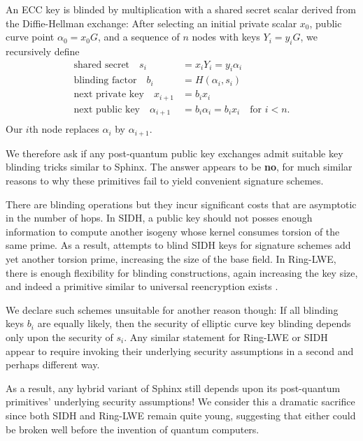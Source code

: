 \documentclass[twoside,letterpaper]{sig-alternate}
\def\mathcomma{,}
\def\mathcomma{}
\begin{document}
An ECC key is blinded by multiplication with a shared secret scalar
derived from the Diffie-Hellman exchange:
After selecting an initial private scalar $x_0$,
 public curve point $\alpha_0 = x_0 G$, and 
 a sequence of $n$ nodes with keys $Y_i = y_i G$,
we recursively define 
\[ \begin{aligned}
\textrm{shared secret}\quad
 s_i &= x_i Y_i = y_i \alpha_i \mathcomma \\
\textrm{blinding factor}\quad
 b_i &= H(\alpha_i,s_i) \mathcomma \\
\textrm{next private key}\quad
 x_{i+1} &= b_i x_i \mathcomma \\ %
\textrm{next public key}\quad
 \alpha_{i+1} &= b_i \alpha_i = b_i x_i \quad\textrm{for $i < n$.} \\
\end{aligned} \]
Our $i$th node replaces $\alpha_i$ by $\alpha_{i+1}$.

\smallskip

We therefore ask if any post-quantum public key exchanges admit 
suitable key blinding tricks similar to Sphinx. 
The answer appears to be {\bf no}, for much similar reasons to 
why these primitives fail to yield convenient signature schemes. 

There are blinding operations but they incur significant costs 
that are asymptotic in the number of hops.
%
In SIDH, a public key should not posses enough information to compute
another isogeny whose kernel consumes torsion of the same prime. 
As a result, attempts to blind SIDH keys for signature schemes add
yet another torsion prime, increasing the size of the base field.
%
In Ring-LWE, there is enough flexibility for blinding constructions,
again increasing the key size, and indeed a primitive similar to
universal reencryption exists \cite{963628}.

We declare such schemes unsuitable for another reason though: 
%
If all blinding keys $b_i$ are equally likely, then the security of
elliptic curve key blinding depends only upon the security of $s_i$.
%
Any similar statement for Ring-LWE or SIDH appear to require invoking
their underlying security assumptions in a second and perhaps different way.

As a result, any hybrid variant of Sphinx still depends upon its
post-quantum primitives' underlying security assumptions! 
%
We consider this a dramatic sacrifice since both SIDH and Ring-LWE
remain quite young, suggesting that either could be broken well
 before the invention of quantum computers.
\end{document}
